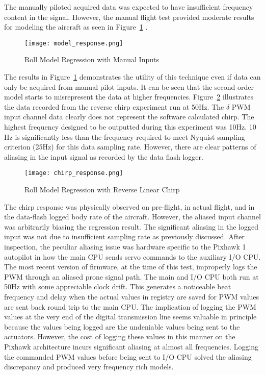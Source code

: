 The manually piloted acquired data was expected to have insufficient frequency content in the signal.  However, the manual flight test provided moderate results for modeling the aircraft as seen in Figure~\ref{fig:roll_model} .

\begin{figure}[!h]
 \centering
  \texttt{[image: model\_response.png]}
  \caption{Roll Model Regression with Manual Inputs}
  \label{fig:roll_model}
\end{figure}

The results in Figure~\ref{fig:roll_model} demonstrates the utility of this technique even if data can only be acquired from manual pilot inputs.  It can be seen that the second order model starts to misrepresent the data at higher frequencies.  Figure~\ref{fig:chirp_model} illustrates the data recorded from the reverse chirp experiment run at 50Hz.  The $\delta$ \ac{PWM} input channel data clearly does not represent the software calculated chirp.  The highest frequency designed to be outputted during this experiment was 10Hz.  10 Hz is significantly less than the frequency required to meet Nyquist sampling criterion (25Hz)  for this data sampling rate.  However, there are clear patterns of aliasing in the input signal as recorded by the data flash logger.  

\begin{figure}[!h]
 \centering
  \texttt{[image: chirp\_response.png]}
  \caption{Roll Model Regression with Reverse Linear Chirp}
  \label{fig:chirp_model}
\end{figure}

The chirp response was physically observed on pre-flight, in actual flight, and in the data-flash logged body rate of the aircraft.  However, the aliased input channel was arbitrarily biasing the regression result.  The significant aliasing in the logged input was not due to insufficient sampling rate as previously discussed.  After inspection,  the peculiar aliasing issue was hardware specific to the Pixhawk 1 autopilot in how the main CPU sends servo commands to the auxiliary I/O  CPU.  The most recent version of firmware, at the time of this test, improperly logs the \ac{PWM} through an aliased prone signal path.  The main and I/O CPU both run at 50Hz with some appreciable clock drift.  This generates a noticeable beat frequency and delay when the actual values in registry are saved for \ac{PWM} values are sent back round trip to the main CPU.  The implication of logging the \ac{PWM} values at the very end of the digital transmission line seems valuable in principle because the values being logged are the undeniable values being sent to the actuators.  However, the cost of logging these values in this manner on the Pixhawk architecture incurs significant aliasing at almost all frequencies.  Logging the commanded \ac{PWM} values before being sent to I/O CPU solved the aliasing discrepancy and produced very frequency rich models.

